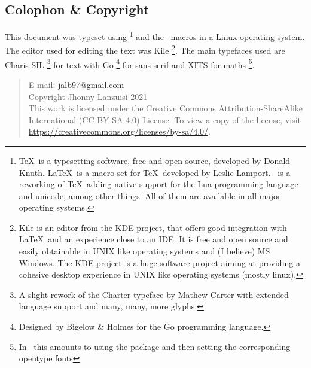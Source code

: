 \newpage
\begin{small}
    \begin{center}
    \begin{minipage}{0.4\paperwidth}
        \section*{Colophon \& Copyright}
        This document was typeset using \LuaTeX%
        \footnote{%
        \TeX\ is
        a typesetting software, free and open source,
        developed by Donald Knuth. \LaTeX\ is a macro
        set for \TeX\ developed by Leslie Lamport. \LuaTeX\ is
        a reworking of \TeX\ adding native support for the Lua
        programming language and unicode, among other things.
        All of them are available in all major
        operating systems.
        }
        and the \LaTeXe\ macros in a Linux operating system.
        The editor used for editing the text was Kile%
        \footnote{
        Kile is an editor from the KDE project,
        that offers good integration with \LaTeX\
        and an experience close to an IDE.
        It is free and open source and easily
        obtainable in UNIX like operating systems
        and (I believe) MS Windows.
        The KDE project is a huge software project
        aiming at providing a cohesive desktop experience
        in UNIX like operating systems (mostly linux).
        }.
        The main typefaces used are Charis SIL%
        \footnote{
        A slight rework of the Charter
        typeface by Mathew Carter
        with extended language support and many,
        many, more glyphs.
        }
        for text with Go%
        \footnote{
        Designed by Bigelow \& Holmes for the
        Go programming language.
        }
        for sans-serif
        and XITS for maths%
        \footnote{%
        In \LuaLaTeX\ this amounts to using the package
        and then setting the corresponding
        opentype fonts}.

        \medskip
        \begin{quote}\sffamily\raggedright
        E-mail: \url{jalb97@gmail.com} \\
        Copyright Jhonny Lanzuisi 2021\\
        This work is licensed under the Creative Commons Attribution-ShareAlike
        International (CC BY-SA 4.0)  License. To view a copy of the license,
        visit \url{https://creativecommons.org/licenses/by-sa/4.0/}.
        \end{quote}
    \end{minipage}
    \end{center}
\end{small}
\newpage
\tableofcontents

